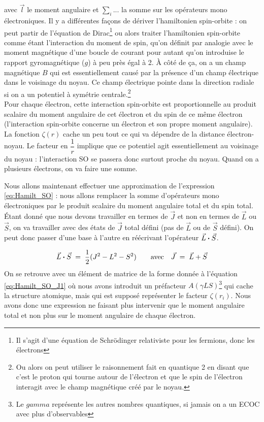 avec $\vec{l}$ le moment angulaire et $\sum_i...$ la somme sur les opérateurs mono électroniques. Il y a différentes façons de dériver l’hamiltonien spin-orbite : on peut partir de l’équation de Dirac\footnote{Il s'agit d'une équation de Schrödinger relativiste pour les fermions, donc les électrons} ou alors traiter l’hamiltonien spin-orbite comme étant l’interaction du moment de spin, qu’on définit par analogie avec le moment magnétique d’une boucle de courant pour autant qu’on introduise le rapport gyromagnétique ($g$) à peu près égal à 2. À côté de ça, on a un champ magnétique $B$ qui est essentiellement causé par la présence d’un champ électrique dans le voisinage du noyau. Ce champ électrique pointe dans la direction radiale si on a un potentiel à symétrie centrale.\footnote{Ou alors on peut utiliser le raisonnement fait en quantique 2 en disant que c'est le proton qui tourne autour de l'électron et que le spin de l'électron interagit avec le champ magnétique créé par le noyau.}\\

Pour chaque électron, cette interaction spin-orbite est proportionnelle au produit scalaire du moment angulaire de cet électron et du spin de ce même électron (l'interaction spin-orbite concerne un électron et son propre moment angulaire). La fonction $\zeta(r)$ cache un peu tout ce qui va dépendre de la distance électron-noyau. Le facteur en $\dfrac{1}{r}$ implique que ce potentiel agit essentiellement au voisinage du noyau : l'interaction SO se passera donc surtout proche du noyau. Quand on a plusieurs électrons, on va faire une somme.

Nous allons maintenant effectuer une approximation de l'expression \eqref{eq:Hamilt_SO} : nous allons remplacer la somme d’opérateurs mono électroniques par le produit scalaire du moment angulaire total et du spin total. Étant donné que nous devons travailler en termes de $\vec{J}$ et non en termes de $\vec{L}$ ou $\vec{S}$, on va travailler avec des états de $\vec{J}$ total défini (pas de $\vec{L}$ ou de $\vec{S}$ défini). On peut donc passer d’une base à l’autre en réécrivant l’opérateur $\vec{L}\boldsymbol{\cdot}\vec{S}$.

\begin{equation}
    \vec{L}\boldsymbol{\cdot}\vec{S} \; = \;  \dfrac{1}{2}(J^2-L^2-S^2) \qquad \mathrm{avec} \quad \vec{J} \; = \;  \vec{L}+\vec{S}
    \label{eq:JLS}
\end{equation}
On se retrouve avec un élément de matrice de la forme donnée à l'équation \eqref{eq:Hamilt_SO_J1} où nous avons introduit un préfacteur $A(\gamma L S)$\footnote{Le $gamma$ représente les autres nombres quantiques, si jamais on a un ECOC avec plus d'observables} qui cache la structure atomique, mais qui est supposé représenter le facteur $\zeta(r_i)$. Nous avons donc une expression ne faisant plus intervenir que le moment angulaire total et non plus sur le moment angulaire de chaque électron.

